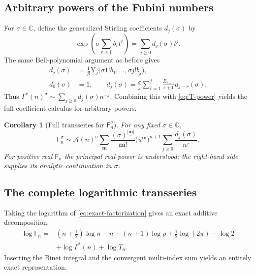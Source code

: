 \documentclass[11pt,a4paper,oneside]{article}
\newtheorem{corollary}[theorem]{Corollary}
\theoremstyle{definition}
\theoremstyle{remark}
\newcommand{\Fub}{\mathsf{F}}
\newcommand{\BellY}{\mathrm{Y}}
\newcommand{\falling}[2]{(#1)^{\underline{#2}}}
\newcommand{\GammaStar}{\Gamma^{\!*}}
\newcommand{\asympseries}{\mathrel{\sim}}
\begin{document}
\subsection{Arbitrary powers of the Fubini numbers}
For $\sigma\in\mathbb C$, define the generalized Stirling coefficients
$d_j(\sigma)$ by
\begin{equation}\label{eq:d-sigma}
 \exp\!\left(\sigma\sum_{r\ge1}b_rt^r\right)
 =\sum_{j\ge0}d_j(\sigma)t^j.
\end{equation}
The same Bell-polynomial argument as before gives
\begin{align}
 d_j(\sigma)
 &=\frac1{j!}\BellY_j\bigl(\sigma1!b_1,\ldots,
                             \sigma j!b_j\bigr),
 \label{eq:d-bell}\\
 d_0(\sigma)&=1,
 \qquad
 d_j(\sigma)=\frac{\sigma}{j}\sum_{r=1}^{j}
     \frac{B_{r+1}}{r+1}d_{j-r}(\sigma).
 \label{eq:d-recurrence}
\end{align}
Thus
\(
 \GammaStar(n)^\sigma\sim\sum_{j\ge0}d_j(\sigma)n^{-j}
\).
Combining this with \cref{eq:T-power} yields the full coefficient calculus
for arbitrary powers.

\begin{corollary}[Full transseries for $\Fub_n^\sigma$]
\label{cor:F-power}
For any fixed $\sigma\in\mathbb C$,
\begin{equation}\label{eq:F-power}
 \Fub_n^\sigma\asympseries
 \mathcal A(n)^\sigma
 \sum_{\bm m}
 \frac{\falling{\sigma}{|\bm m|}}{\bm m!}
 \bigl(u^{\bm m}\bigr)^{n+1}
 \sum_{j\ge0}\frac{d_j(\sigma)}{n^j}.
\end{equation}
For positive real $\Fub_n$ the principal real power is understood; the
right-hand side supplies its analytic continuation in $\sigma$.
\end{corollary}

\subsection{The complete logarithmic transseries}
Taking the logarithm of \cref{eq:exact-factorization} gives an exact additive
decomposition:
\begin{align}
 \log\Fub_n
 ={}&(n+\tfrac12)\log n-n-(n+1)\log\rho
      +\tfrac12\log(2\pi)-\log2\nonumber\\
 &+\log\GammaStar(n)+\log T_n.
 \label{eq:log-exact-decomp}
\end{align}
Inserting the Binet integral and the convergent multi-index sum yields an
entirely exact representation.
\end{document}
